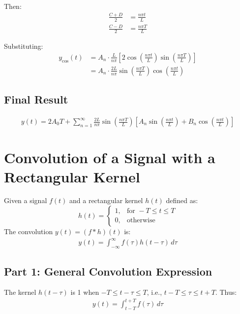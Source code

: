\documentclass{article}
\begin{document}
Then:
\begin{align*}
\frac{C + D}{2} &= \frac{n\pi t}{L} \\
\frac{C - D}{2} &= \frac{n\pi T}{L}
\end{align*}

Substituting:
\begin{align*}
y_{\text{cos}}(t) &= A_n \cdot \frac{L}{n\pi} \left[ 2 \cos\left(\frac{n\pi t}{L}\right) \sin\left(\frac{n\pi T}{L}\right) \right] \\
&= A_n \cdot \frac{2L}{n\pi} \sin\left(\frac{n\pi T}{L}\right) \cos\left(\frac{n\pi t}{L}\right)
\end{align*}

\subsection*{Final Result}
\begin{align*}
y(t) = 2A_0 T + \sum_{n=1}^\infty \frac{2L}{n\pi} \sin\left(\frac{n\pi T}{L}\right) \left[ A_n \sin\left(\frac{n\pi t}{L}\right) + B_n \cos\left(\frac{n\pi t}{L}\right) \right]
\end{align*}

\section*{Convolution of a Signal with a Rectangular Kernel}

Given a signal $f(t)$ and a rectangular kernel $h(t)$ defined as:
\[
h(t)=
\begin{cases}
    1, & \text{for } -T \leq t \leq T \\
    0, & \text{otherwise}
\end{cases}
\]
The convolution $y(t) = (f * h)(t)$ is:
\begin{align*}
y(t) = \int_{-\infty}^{\infty} f(\tau) h(t - \tau) \,d\tau
\end{align*}

\subsection*{Part 1: General Convolution Expression}
The kernel $h(t - \tau)$ is 1 when $-T \leq t - \tau \leq T$, i.e., $t - T \leq \tau \leq t + T$. Thus:
\begin{align*}
y(t) = \int_{t - T}^{t + T} f(\tau) \,d\tau
\end{align*}
\end{document}

